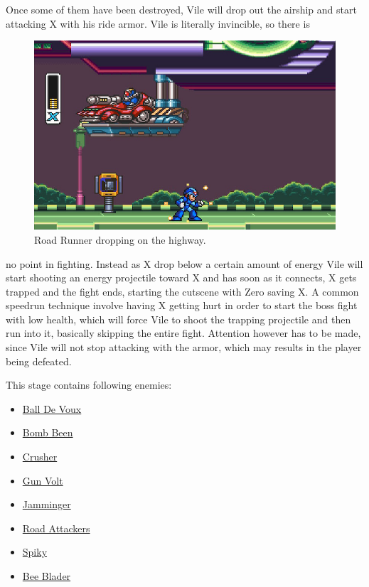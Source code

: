  Once some of them have been destroyed, Vile will drop out the airship and start attacking X with his ride armor. Vile is literally invincible, so there is 
 \begin{figure}
 	\vspace{-10pt}
 	\centering
 	\includegraphics[width=\linewidth]{figures/X1/Highway_screenshot_2.jpg}
 	\caption{Road Runner dropping on the highway.}
 \end{figure}
 no point in fighting. Instead as X drop below a certain amount of energy Vile will start shooting an energy projectile toward X and has soon as it connects, X gets trapped and the fight ends, starting the cutscene with Zero saving X. A common speedrun  technique involve having X getting hurt in order to start the boss fight with low health, which will force Vile to shoot the trapping projectile and then run into it, basically skipping the entire fight.  Attention however has to be made, since Vile will not stop attacking with the armor, which may results in the player being defeated.

This stage contains following enemies\cite{wiki:Highway}:
\begin{itemize}
	\item \hyperlink{enem:Ball_De_Voux}{Ball De Voux }
	\item \hyperlink{enem:Bomb_Been}{Bomb Been }
	\item \hyperlink{enem:Crusher}{Crusher }
	\item \hyperlink{enem:Gun_Volt}{Gun Volt}
	\item \hyperlink{enem:Jamminger}{Jamminger}
	\item \hyperlink{enem:Road_Attackers}{Road Attackers }
	\item \hyperlink{enem:Spiky}{Spiky }
	\item \hyperlink{miniboss:Bee_Blader}{Bee Blader }
\end{itemize}

